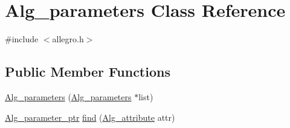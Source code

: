 \hypertarget{class_alg__parameters}{}\section{Alg\+\_\+parameters Class Reference}
\label{class_alg__parameters}


{\ttfamily \#include $<$allegro.\+h$>$}

\subsection*{Public Member Functions}
\begin{DoxyCompactItemize}
\item 
\hyperlink{class_alg__parameters_a1a8cc7e3ff656b252d4472c859780d39}{Alg\+\_\+parameters} (\hyperlink{class_alg__parameters}{Alg\+\_\+parameters} $\ast$list)
\item 
\hyperlink{allegro_8h_a11b6679f8e1fe576476b10e4bc1f7240}{Alg\+\_\+parameter\+\_\+ptr} \hyperlink{class_alg__parameters_a1781c4b173f0ee01937273c8bd24ef64}{find} (\hyperlink{allegro_8h_a45c52ae87418a599d8196abd30aea3bd}{Alg\+\_\+attribute} attr)
\end{DoxyCompactItemize}
